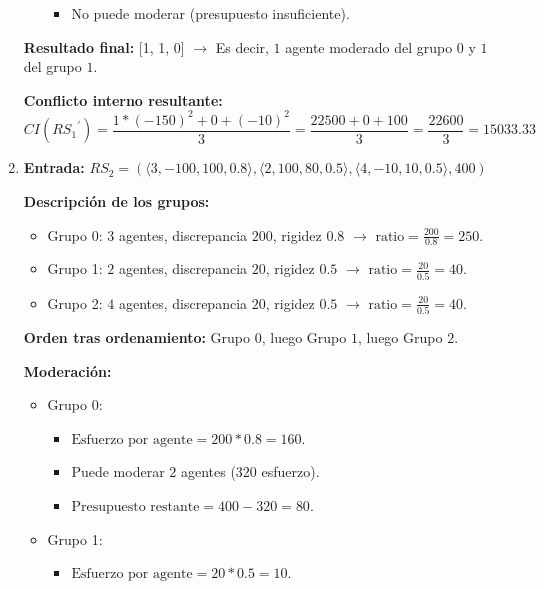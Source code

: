 \begin{enumerate}
\begin{itemize}
\begin{itemize}
				\item No puede moderar (presupuesto insuficiente).
			\end{itemize}
	\end{itemize}

	\textbf{Resultado final:} [1, 1, 0] $\rightarrow$ Es decir, $1$ agente moderado del grupo $0$ y $1$ del grupo $1$.

	\textbf{Conflicto interno resultante:}
	\begin{equation}
		CI\left( { RS_1 }^\prime \right) = \frac{ 1 * (-150)^2 + 0 + (-10)^2 }{ 3 } = \frac{ 22500 + 0 + 100 }{ 3 } = \frac{ 22600 }{ 3 } = 15033.33
	\end{equation}

	\item \textbf{Entrada:} $RS_2 = (\langle 3,-100,100,0.8 \rangle, \langle 2,100,80,0.5 \rangle, \langle 4,-10,10,0.5 \rangle,400)$

	\textbf{Descripción de los grupos:}
		\begin{itemize}
			\item Grupo 0: $3$ agentes, discrepancia $200$, rigidez $0.8$ $\rightarrow$ $\text{ratio} = \frac{ 200 }{ 0.8 } = 250$.

			\item Grupo 1: $2$ agentes, discrepancia $20$, rigidez $0.5$ $\rightarrow$ $\text{ratio} = \frac{ 20 }{ 0.5 } = 40$.

			\item Grupo 2: $4$ agentes, discrepancia $20$, rigidez $0.5$ $\rightarrow$ $\text{ratio} = \frac{ 20 }{ 0.5 } = 40$.
		\end{itemize}

	\textbf{Orden tras ordenamiento:} Grupo $0$, luego Grupo $1$, luego Grupo $2$.

	\textbf{Moderación:}
	\begin{itemize}
		\item Grupo 0:
			\begin{itemize}
				\item $\text{Esfuerzo por agente} = 200 * 0.8 = 160$.

				\item Puede moderar $2$ agentes ($320$ esfuerzo).

				\item $\text{Presupuesto restante} = 400 - 320 = 80$.
			\end{itemize}
		\item Grupo 1:
			\begin{itemize}
				\item $\text{Esfuerzo por agente} = 20 * 0.5 = 10$.


\end{itemize}
\end{itemize}
\end{enumerate}

